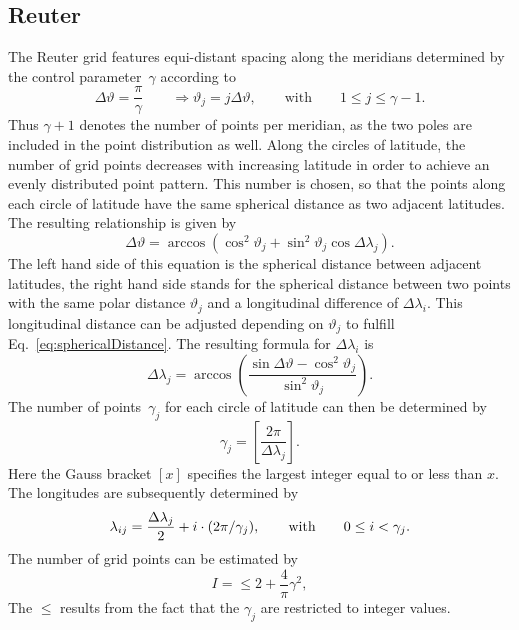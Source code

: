 \subsection{Reuter}
The Reuter grid features equi-distant spacing along the meridians determined
by the control parameter~$\gamma$ according to
\begin{equation}
\Delta\vartheta=\frac{\pi}{\gamma}\qquad\Rightarrow\vartheta_j=j\Delta\vartheta,\qquad\mbox{with}\qquad 1\leq j\leq \gamma-1.
\end{equation}
Thus $\gamma+1$ denotes the number of points per meridian, as the two poles
are included in the point distribution as well. Along the circles of latitude,
the number of grid points decreases with increasing latitude in order to achieve
an evenly distributed point pattern. This number is chosen, so that the points
along each circle of latitude have the same spherical distance as two adjacent
latitudes. The resulting relationship is given by
\begin{equation}\label{eq:sphericalDistance}
\Delta\vartheta=\arccos\left( \cos^2\vartheta_j+\sin^2\vartheta_j\cos\Delta\lambda_j\right).
\end{equation}
The left hand side of this equation is the spherical distance between adjacent
latitudes, the right hand side stands for the spherical distance between two points
with the same polar distance $\vartheta_j$ and a longitudinal difference of
$\Delta\lambda_i$. This longitudinal distance can be adjusted depending on
$\vartheta_j$ to fulfill Eq.~\eqref{eq:sphericalDistance}. The resulting
formula for $\Delta\lambda_i$ is
\begin{equation}\label{eq:deltaLambdai}
\Delta\lambda_j=\arccos\left( \frac{\sin\Delta\vartheta -\cos^2\vartheta_j}{\sin^2\vartheta_j}\right).
\end{equation}
The number of points~$\gamma_j$ for each circle of latitude can then be determined by
\begin{equation}\label{eq:gammai}
\gamma_j=\left[ \frac{2\pi}{\Delta\lambda_j}\right] .
\end{equation}
Here the Gauss bracket $[x]$ specifies the largest integer equal to or less than $x$.
The longitudes are subsequently determined by
\begin{equation}
\lambda_{ij}=\frac{\Delta\lambda_j}{2}+i\cdot(2\pi/\gamma_j),\qquad \mbox{with\qquad}0\leq i< \gamma_j.
\end{equation}
The number of grid points can be estimated by
\begin{equation}\label{eq:numberReuter}
I=\leq 2+\frac{4}{\pi}\gamma^2,
\end{equation}
The $\leq$ results from the fact that the $\gamma_j$ are restricted to integer values.


